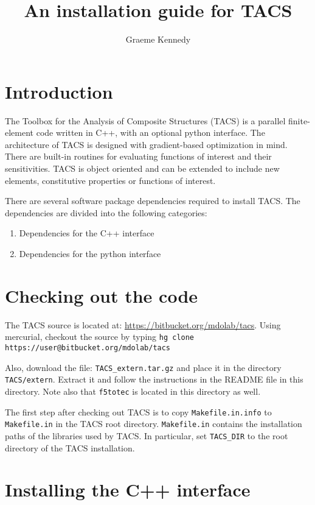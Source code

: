 \documentclass{article}
\title{An installation guide for TACS}
\author{Graeme Kennedy}
\begin{document}
\maketitle

\section{Introduction}

The Toolbox for the Analysis of Composite Structures (TACS) is a
parallel finite-element code written in C++, with an optional python
interface. The architecture of TACS is designed with gradient-based
optimization in mind. There are built-in routines for evaluating
functions of interest and their sensitivities. TACS is object oriented
and can be extended to include new elements, constitutive properties
or functions of interest.

There are several software package dependencies required to install
TACS. The dependencies are divided into the following categories:
\begin{enumerate}
\item Dependencies for the C++ interface
\item Dependencies for the python interface
\end{enumerate}

\section{Checking out the code}

The TACS source is located at:
\url{https://bitbucket.org/mdolab/tacs}. Using mercurial, checkout the
source by typing \texttt{hg clone
  https://user@bitbucket.org/mdolab/tacs}

Also, download the file: \texttt{TACS\_extern.tar.gz} and place it in
the directory \texttt{TACS/extern}. Extract it and follow the
instructions in the README file in this directory. Note also that
\texttt{f5totec} is located in this directory as well.

The first step after checking out TACS is to copy
\texttt{Makefile.in.info} to \texttt{Makefile.in} in the TACS root
directory. \texttt{Makefile.in} contains the installation paths of the
libraries used by TACS. In particular, set \texttt{TACS\_DIR} to the
root directory of the TACS installation.

\section{Installing the C++ interface}
\end{document}

